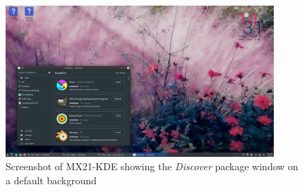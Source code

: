 %

\begin{figure}[!h]
  \centering
   \includegraphics[width=0.9\textwidth]{mxkdescreen.png}
  \caption{Screenshot of MX21-KDE showing the {\em Discover} package window on a default background}
  \label{fig:mxkde}
\end{figure}

%

